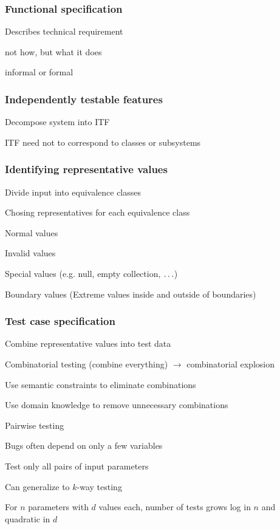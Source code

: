 \subsubsection{Functional specification}
\enumstart
	\item Describes technical requirement
	\item not how, but what it does
	\item informal or formal
\enumend

\subsubsection{Independently testable features}
\enumstart
	\item Decompose system into ITF
	\item ITF need not to correspond to classes or subsystems
\enumend

\subsubsection{Identifying representative values}
\enumstart
	\item Divide input into equivalence classes
	\item Chosing representatives for each equivalence class
	\enumstart
		\item Normal values
		\item Invalid values
		\item Special values (e.g. null, empty collection, $\mathellipsis$)
		\item Boundary values (Extreme values inside and outside of boundaries)
	\enumend
\enumend

\subsubsection{Test case specification}
\enumstart
	\item Combine representative values into test data
	\item Combinatorial testing (combine everything) $\rightarrow$ combinatorial explosion
	\enumstart
		\item Use semantic constraints to eliminate combinations
		\item Use domain knowledge to remove unnecessary combinations
	\enumend
	\item Pairwise testing
	\enumstart
		\item Bugs often depend on only a few variables
		\item Test only all pairs of input parameters
		\item Can generalize to $k$-way testing
		\item For $n$ parameters with $d$ values each, number of tests grows log in $n$ and quadratic in $d$
	\enumend
\enumend


